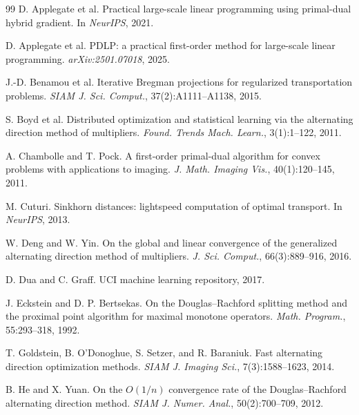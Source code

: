 \documentclass{article}
\begin{document}
\clearpage
\begin{thebibliography}{99}
D. Applegate et al. Practical large-scale linear programming using primal-dual
hybrid gradient. In \emph{NeurIPS}, 2021.

D. Applegate et al. PDLP: a practical first-order method for large-scale linear
programming. \emph{arXiv:2501.07018}, 2025.

J.-D. Benamou et al. Iterative Bregman projections for regularized transportation
problems. \emph{SIAM J. Sci. Comput.}, 37(2):A1111--A1138, 2015.

S. Boyd et al. Distributed optimization and statistical learning via the alternating
direction method of multipliers. \emph{Found. Trends Mach. Learn.}, 3(1):1--122, 2011.

A. Chambolle and T. Pock. A first-order primal-dual algorithm for convex problems with
applications to imaging. \emph{J. Math. Imaging Vis.}, 40(1):120--145, 2011.

M. Cuturi. Sinkhorn distances: lightspeed computation of optimal transport. In
\emph{NeurIPS}, 2013.

W. Deng and W. Yin. On the global and linear convergence of the generalized
alternating direction method of multipliers. \emph{J. Sci. Comput.},
66(3):889--916, 2016.

D. Dua and C. Graff. UCI machine learning repository, 2017.

J. Eckstein and D. P. Bertsekas. On the Douglas--Rachford splitting method and the
proximal point algorithm for maximal monotone operators. \emph{Math. Program.},
55:293--318, 1992.

T. Goldstein, B. O'Donoghue, S. Setzer, and R. Baraniuk. Fast alternating direction
optimization methods. \emph{SIAM J. Imaging Sci.}, 7(3):1588--1623, 2014.

B. He and X. Yuan. On the $O(1/n)$ convergence rate of the Douglas--Rachford
alternating direction method. \emph{SIAM J. Numer. Anal.}, 50(2):700--709, 2012.


\end{thebibliography}
\end{document}
